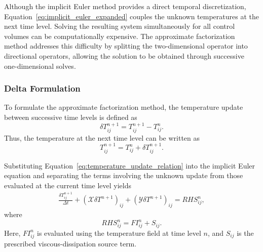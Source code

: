Although the implicit Euler method provides a direct temporal
discretization, Equation~\eqref{eq:implicit_euler_expanded}
couples the unknown temperatures at the next time level.
Solving the resulting system simultaneously for all control
volumes can be computationally expensive. The approximate
factorization method addresses this difficulty by splitting
the two-dimensional operator into directional operators,
allowing the solution to be obtained through successive
one-dimensional solves.

\subsubsection{Delta Formulation}

To formulate the approximate factorization method, the
temperature update between successive time levels is defined as
\begin{equation}
\delta T_{ij}^{n+1}
=
T_{ij}^{n+1}-T_{ij}^{n}.
\label{eq:temperature_update}
\end{equation}
Thus, the temperature at the next time level can be written as
\begin{equation}
T_{ij}^{n+1}=T_{ij}^{n}+\delta T_{ij}^{n+1}.
\label{eq:temperature_update_relation}
\end{equation}

Substituting Equation~\eqref{eq:temperature_update_relation}
into the implicit Euler equation and separating the terms
involving the unknown update from those evaluated at the
current time level yields
\begin{equation}
\begin{aligned}
\frac{\delta T_{ij}^{n+1}}{\Delta t}
+\left(\mathcal{X}\delta T^{n+1}\right)_{ij}
+\left(\mathcal{Y}\delta T^{n+1}\right)_{ij}
=
RHS_{ij}^{n},
\end{aligned}
\label{eq:delta_form}
\end{equation}
where
\begin{equation}
RHS_{ij}^{n}=FI_{ij}^{n}+S_{ij}.
\label{eq:rhs_old_time}
\end{equation}
Here, $FI_{ij}^{n}$ is evaluated using the temperature field
at time level $n$, and $S_{ij}$ is the prescribed
viscous-dissipation source term.

